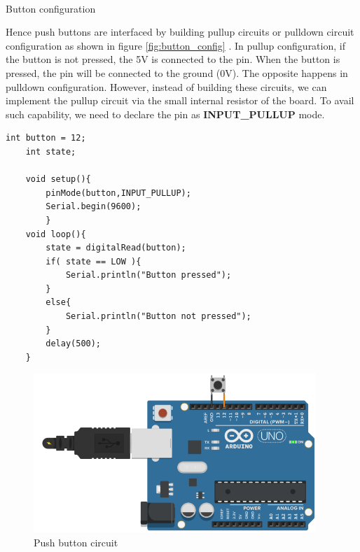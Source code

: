     \begin{marginfigure}
        \centering
        \\
        \caption{Button configuration}
        \label{fig:button_config}
    \end{marginfigure}
    
    Hence push buttons are interfaced by building pullup circuits or pulldown circuit configuration as shown in figure \ref{fig:button_config} . In pullup configuration, if the button is not pressed, the 5V is connected to the pin. When the button is pressed, the pin will be connected to the ground (0V). The opposite happens in pulldown configuration. However, instead of building these circuits, we can implement the pullup circuit via the small internal resistor of the board. To avail such capability, we need to declare the pin as \textbf{INPUT\_PULLUP} mode.

    \begin{lstlisting}[style=CStyle]
    int button = 12;
    int state;

    void setup(){
        pinMode(button,INPUT_PULLUP);
        Serial.begin(9600);
        }
    void loop(){
        state = digitalRead(button);
        if( state == LOW ){
            Serial.println("Button pressed");
        }
        else{
            Serial.println("Button not pressed");
        }
        delay(500);
    }
    \end{lstlisting}
    
    \begin{figure}
        \centering
        \includegraphics[width=4.2in]{Images/Programing_Arduino/button_ckt.png}
        \caption{Push button circuit}
    \end{figure}
    
